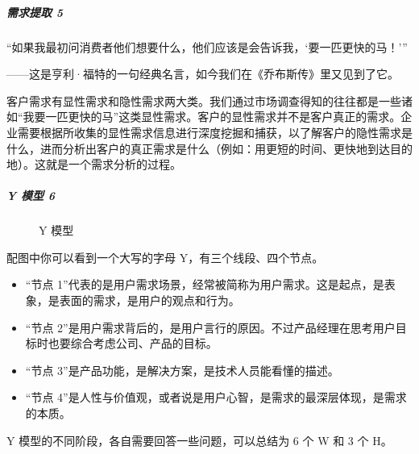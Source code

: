 \documentclass[letterpaper,10pt,english]{sphinxmanual}
\begin{document}
\subparagraph{需求提取 5\sphinxfootnotemark[540]}
\label{\detokenize{chapter_knowledge/demand_analysis:id5}}%
\begin{footnotetext}[540]\sphinxAtStartFootnote
{}
%
\end{footnotetext}\ignorespaces 
“如果我最初问消费者他们想要什么，他们应该是会告诉我，‘要一匹更快的马！’”

——这是亨利·福特的一句经典名言，如今我们在《乔布斯传》里又见到了它。

客户需求有显性需求和隐性需求两大类。我们通过市场调查得知的往往都是一些诸如“我要一匹更快的马”这类显性需求。客户的显性需求并不是客户真正的需求。企业需要根据所收集的显性需求信息进行深度挖掘和捕获，以了解客户的隐性需求是什么，进而分析出客户的真正需求是什么（例如：用更短的时间、更快地到达目的地）。这就是一个需求分析的过程。


\subparagraph{Y 模型 6\sphinxfootnotemark[541]}
\label{\detokenize{chapter_knowledge/demand_analysis:y-6}}%
\begin{footnotetext}[541]\sphinxAtStartFootnote
{}
%
\end{footnotetext}\ignorespaces 
\begin{figure}[H]
\centering
\capstart

\noindent{}
\caption{Y 模型}\label{\detokenize{chapter_knowledge/demand_analysis:id18}}\end{figure}

配图中你可以看到一个大写的字母 Y，有三个线段、四个节点。
\begin{itemize}
\item {} 
“节点
1”代表的是用户需求场景，经常被简称为用户需求。这是起点，是表象，是表面的需求，是用户的观点和行为。

\item {} 
“节点
2”是用户需求背后的，是用户言行的原因。不过产品经理在思考用户目标时也要综合考虑公司、产品的目标。

\item {} 
“节点 3”是产品功能，是解决方案，是技术人员能看懂的描述。

\item {} 
“节点
4”是人性与价值观，或者说是用户心智，是需求的最深层体现，是需求的本质。

\end{itemize}

Y 模型的不同阶段，各自需要回答一些问题，可以总结为 6 个 W 和 3 个 H。
\end{document}
